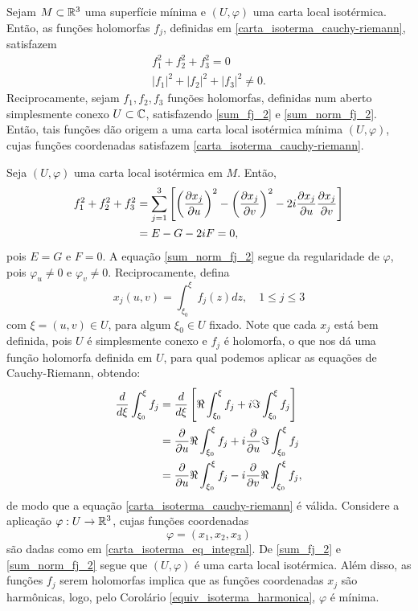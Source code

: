 \begin{lema}\label{lema_fj_2}
	Sejam $M \subset \mathbb{R}^3$ uma superfície mínima e $(U, \varphi)$ uma carta local isotérmica. Então, as funções holomorfas $f_j$, definidas em \eqref{carta_isoterma_cauchy-riemann}, satisfazem
	\begin{gather}\label{sum_fj_2}
	f_1^2 + f_2^2 + f_3^2 = 0\\ \label{sum_norm_fj_2}
	|f_1|^2 + |f_2|^2 + |f_3|^2 \neq 0.
	\end{gather}
	Reciprocamente, sejam $f_1, f_2, f_3$ funções holomorfas, definidas num aberto simplesmente conexo $U \subset \mathbb{C}$, satisfazendo \eqref{sum_fj_2} e \eqref{sum_norm_fj_2}. Então, tais funções dão origem a uma carta local isotérmica mínima $(U, \varphi)$, cujas funções coordenadas satisfazem \eqref{carta_isoterma_cauchy-riemann}.
\end{lema}

\begin{demonstracao}
	Seja $(U, \varphi)$ uma carta local isotérmica em $M$. Então,
	\begin{align*}
	f_1^2 + f_2^2 + f_3^2 &= \sum_{j=1}^{3} \left[ \left( \frac{\partial x_j}{\partial u} \right)^2 - \left( \frac{\partial x_j}{\partial v} \right)^2 - 2i \frac{\partial x_j}{\partial u} \frac{\partial x_j}{\partial v} \right]\\
	&= E - G - 2iF = 0,
	\end{align*}
	pois $E=G$ e $F=0$. A equação \eqref{sum_norm_fj_2} segue da regularidade de $\varphi$, pois $\varphi_u \neq 0$ e $\varphi_v \neq 0$.
	Reciprocamente, defina
	\begin{equation}\label{carta_isoterma_eq_integral}
	x_j(u,v) = \int_{\xi_0}^{\xi} f_j(z) dz, \quad 1 \leq j \leq 3
	\end{equation}
	com $\xi = (u,v) \in U$, para algum $\xi_0 \in U$ fixado. Note que cada $x_j$ está bem definida, pois $U$ é simplesmente conexo e $f_j$ é holomorfa, o que nos dá uma função holomorfa definida em $U$, para qual podemos aplicar as equações de Cauchy-Riemann, obtendo:
	\begin{align*}
	\frac{d}{d \xi} \int_{\xi_0}^{\xi} f_j &= \frac{d}{d \xi} \left[ \Re \int_{\xi_0}^{\xi} f_j + i \Im \int_{\xi_0}^{\xi} f_j \right]\\
	&= \frac{\partial}{\partial u} \Re \int_{\xi_0}^{\xi} f_j + i \frac{\partial}{\partial u} \Im \int_{\xi_0}^{\xi} f_j\\
	&= \frac{\partial}{\partial u} \Re \int_{\xi_0}^{\xi} f_j - i \frac{\partial}{\partial v} \Re \int_{\xi_0}^{\xi} f_j,
	\end{align*}
	de modo que a equação \eqref{carta_isoterma_cauchy-riemann} é válida. Considere a aplicação $\varphi: U \rightarrow \mathbb{R}^3$, cujas funções coordenadas
	\begin{equation*}
	\varphi = (x_1,x_2,x_3)
	\end{equation*}
	são dadas como em \eqref{carta_isoterma_eq_integral}. De \eqref{sum_fj_2} e \eqref{sum_norm_fj_2} segue que $(U,\varphi)$ é uma carta local isotérmica. Além disso, as funções $f_j$ serem holomorfas implica que as funções coordenadas $x_j$ são harmônicas, logo, pelo Corolário \ref{equiv_isoterma_harmonica}, $\varphi$ é mínima.
\end{demonstracao}


